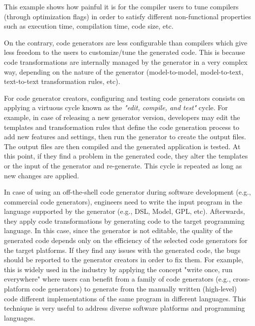 This example shows how painful it is for the compiler users to tune compilers (through optimization flags) in order to satisfy different non-functional properties such as execution time, compilation time, code size, etc.

On the contrary, code generators are less configurable than compilers which give less freedom to the users to customize/tune the generated code. This is because code transformations are internally managed by the generator in a very complex way, depending on the nature of the generator (model-to-model, model-to-text, text-to-text transformation rules, etc).

For code generator creators, configuring and testing code generators consists on applying a virtuous cycle known as the \textit{"edit, compile, and test"} cycle. 
For example, in case of releasing a new generator version, developers may edit the templates and transformation rules that define the code generation process to add new features and settings, then run the generator to create the output files. The output files are then compiled and the generated application is tested. At this point, if they find a problem in the generated code, they alter the templates or the input of the generator and re-generate. This cycle is repeated as long as new changes are applied. 

In case of using an off-the-shell code generator during software development (e.g., commercial code generators), engineers need to write the input program in the language supported by the generator (e.g., DSL, Model, GPL, etc). Afterwards, they apply code transformations by generating code to the target programming language. In this case, since the generator is not editable, the quality of the generated code depends only on the efficiency of the selected code generators for the target platforms. If they find any issues with the generated code, the bugs should be reported to the generator creators in order to fix them.
For example, this is widely used in the industry by applying the concept "write once, run everywhere" where users can benefit from a family of code generators (e.g., cross-platform code generators\cite{fumero2015runtime}) to generate from the manually written (high-level) code different implementations of the same program in different languages. This technique is very useful to address diverse software platforms and programming languages.
 

